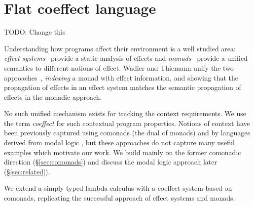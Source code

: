 \chapter{Flat coeffect language} 
\label{ch:flat-coeffects} 


\newcommand{\iunit}{\mathsf{e}}
\newcommand{\imult}{\oplus}
\newcommand{\iftor}[1]{C^{#1}}
\newcommand{\iftorhat}[1]{\hat{C}^{#1}}

\newcommand{\cosem}[1]{\llbracket #1 \rrbracket}
\newcommand{\interp}[1]{\llbracket #1 \rrbracket}
\newcommand{\ccat}[0]{\mathcal{C}}
\newcommand{\obj}[1]{\textnormal{obj}(#1)}

\newcommand{\cobind}[2]{#1^\dagger_{#2}}
\newcommand{\cmerge}[0]{ \ident{m} }
\newcommand{\csplit}[0]{ \ident{n} }
\newcommand{\counit}[0]{ \varepsilon }



TODO: Change this

Understanding how programs affect their environment is a well studied area: \emph{effect 
systems}~\cite{effects-talpin-et-al} provide a static analysis of effects and 
\emph{monads}~\cite{monad-notions} provide a unified semantics to different notions of effect.  
Wadler and Thiemann unify the two approaches~\cite{monads-effects-marriage}, \emph{indexing}
a monad with effect information, and showing that the propagation of effects in an effect system 
matches the semantic propagation of effects in the monadic approach.

No such unified mechanism exists for tracking the context requirements. We use the term 
\emph{coeffect} for such contextual program properties. 
Notions of context have been previously captured using comonads
\cite{comonads-notions} (the dual of monads) 
and by languages derived from modal logic
\cite{logic-modal-reconstruction,logic-cmtt}, but these approaches
do not capture many useful examples which motivate our work. 
We build mainly on the former comonadic direction (\S\ref{sec:comonads}) and discuss the
modal logic approach later (\S\ref{sec:related}).

We extend a simply typed lambda calculus with a coeffect system based on comonads,
replicating the successful approach of effect systems and monads.

